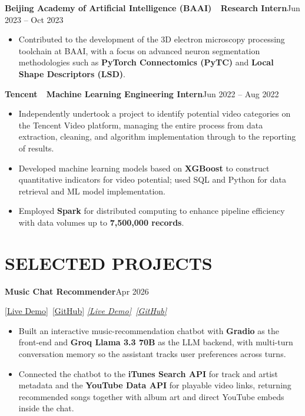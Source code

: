 \documentclass[10pt,letterpaper]{article}
\newcommand{\entry}[4]{%
  \noindent\textbf{\color{ink}#1}\hfill{\color{soft}\small #3}\par%
  \def\tmp{#2}\ifx\tmp\empty\else%
    {\itshape\color{muted}\small #2}\hfill\textit{\color{soft}\small #4}\par%
  \fi%
  \vspace{1pt}%
}
\begin{document}
\vspace{1pt}
\entry{Beijing Academy of Artificial Intelligence (BAAI) \,\textemdash\, Research Intern}{}{Jun 2023 -- Oct 2023}{}
\begin{itemize}
  \item Contributed to the development of the 3D electron microscopy processing toolchain at BAAI, with a focus on advanced neuron segmentation methodologies such as \textbf{PyTorch Connectomics (PyTC)} and \textbf{Local Shape Descriptors (LSD)}.
\end{itemize}

\vspace{1pt}
\entry{Tencent \,\textemdash\, Machine Learning Engineering Intern}{}{Jun 2022 -- Aug 2022}{}
\begin{itemize}
  \item Independently undertook a project to identify potential video categories on the Tencent Video platform, managing the entire process from data extraction, cleaning, and algorithm implementation through to the reporting of results.
  \item Developed machine learning models based on \textbf{XGBoost} to construct quantitative indicators for video potential; used SQL and Python for data retrieval and ML model implementation.
  \item Employed \textbf{Spark} for distributed computing to enhance pipeline efficiency with data volumes up to \textbf{7,500,000 records}.
\end{itemize}

\section{SELECTED PROJECTS}

\entry{Music Chat Recommender}{\href{https://huggingface.co/spaces/Cedric1218/music-chat-recommender}{[Live Demo]} \,\href{https://github.com/cedricshan/music-chat-recommender}{[GitHub]}}{Apr 2026}{}
\begin{itemize}
  \item Built an interactive music-recommendation chatbot with \textbf{Gradio} as the front-end and \textbf{Groq Llama 3.3 70B} as the LLM backend, with multi-turn conversation memory so the assistant tracks user preferences across turns.
  \item Connected the chatbot to the \textbf{iTunes Search API} for track and artist metadata and the \textbf{YouTube Data API} for playable video links, returning recommended songs together with album art and direct YouTube embeds inside the chat.
\end{itemize}
\end{document}
